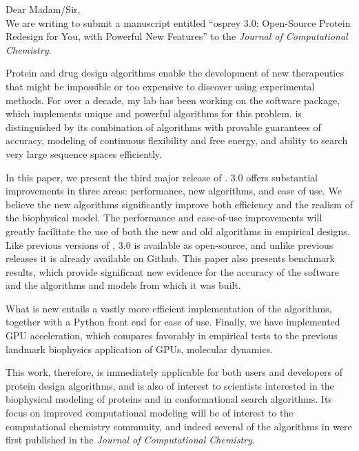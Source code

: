\documentclass[11pt, oneside]{article}   	%
\def\osprey{{\sc{osprey}}\xspace}
\begin{document}


Dear Madam/Sir, 
\\

We are writing to submit a manuscript entitled ``{\sc osprey} 3.0: Open-Source Protein Redesign for You, with Powerful New Features'' to the {\em Journal of Computational Chemistry}.  

Protein and drug design algorithms enable the development of new therapeutics that might be impossible or too expensive to discover using experimental methods.  For over a decade, my lab has been working on the \osprey software package, which implements unique and powerful algorithms for this problem.  \osprey is distinguished by its combination of algorithms with provable guarantees of accuracy, modeling of continuous flexibility and free energy, and ability to search very large sequence spaces efficiently.  

In this paper, we present the third major release of \osprey.  \osprey 3.0 offers substantial improvements in three areas: performance, new algorithms, and ease of use.  We believe the new algorithms significantly improve both efficiency and the realism of the biophysical model.  The performance and ease-of-use improvements will greatly facilitate the use of both the new and old algorithms in empirical designs.  Like previous versions of \osprey, \osprey 3.0 is available as open-source, and unlike previous releases it is already available on Github.  This paper also presents benchmark results, which provide significant new evidence for the accuracy of the software and the algorithms and models from which it was built.  

What is new entails a vastly more efficient implementation of the algorithms, together with a Python front end for ease of use.  Finally, we have implemented GPU acceleration, which compares favorably in empirical tests to the previous landmark biophysics application of GPUs, molecular dynamics.  

This work, therefore, is immediately applicable for both users and developers of protein design algorithms, and is also of interest to scientists interested in the biophysical modeling of proteins and in conformational search algorithms.  Its focus on improved computational modeling will be of interest to the computational chemistry community, and indeed several of the algorithms in \osprey were first published in the {\em Journal of Computational Chemistry}.  
\end{document}
